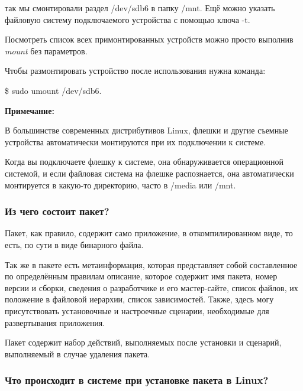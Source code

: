 \documentclass[oneside, final, 14pt]{extreport} %
\begin{document}
так мы смонтировали раздел /dev/sdb6 в папку /mnt. 
Ещё можно указать файловую систему подключаемого устройства с помощью ключа -t. 

Посмотреть список всех примонтированных устройств можно просто выполнив \textit{mount} без параметров.

Чтобы размонтировать устройство после использования нужна команда:

\$ sudo umount /dev/sdb6.

\textbf{Примечание:}

В большинстве современных дистрибутивов Linux, флешки и другие съемные устройства автоматически монтируются при их подключении к системе. 

Когда вы подключаете флешку к системе, она обнаруживается операционной системой, и если файловая система на флешке распознается, она автоматически монтируется в какую-то директорию, часто в /media или /mnt.



\subsubsection{Из чего состоит пакет?}

Пакет, как правило, содержит само приложение, в откомпилированном  виде, то есть, по сути в виде бинарного файла.

Так же в пакете есть метаинформация, которая представляет собой составленное по определённым правилам описание, которое содержит имя пакета, номер версии и сборки, сведения о разработчике и его мастер-сайте, список файлов, их положение в файловой иерархии, список зависимостей. Также, здесь могу присутствовать установочные и настроечные сценарии, необходимые для развертывания приложения.

Пакет содержит набор действий, выполняемых после установки и сценарий, выполняемый в случае удаления пакета.

\subsubsection{Что происходит в системе при установке пакета в Linux?}
\end{document}
